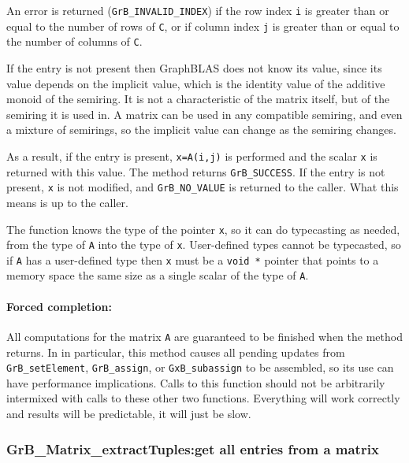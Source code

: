 \documentclass[12pt]{article}
\begin{document}
An error is returned (\verb'GrB_INVALID_INDEX') if the row index \verb'i' is
greater than or equal to the number of rows of \verb'C', or if column index
\verb'j' is greater than or equal to the number of columns of \verb'C'.

If the entry is not present then GraphBLAS does not know its value, since its
value depends on the implicit value, which is the identity value of the
additive monoid of the semiring.  It is not a characteristic of the matrix
itself, but of the semiring it is used in.  A matrix can be used in any
compatible semiring, and even a mixture of semirings, so the implicit value can
change as the semiring changes.

As a result, if the entry is present, \verb'x=A(i,j)' is performed and the
scalar \verb'x' is returned with this value.  The method returns
\verb'GrB_SUCCESS'.  If the entry is not present, \verb'x' is not modified, and
\verb'GrB_NO_VALUE' is returned to the caller.  What this means is up to the
caller.

The function knows the type of the pointer \verb'x', so it can do typecasting
as needed, from the type of \verb'A' into the type of \verb'x'.  User-defined
types cannot be typecasted, so if \verb'A' has a user-defined type then
\verb'x' must be a \verb'void *' pointer that points to a memory space the same
size as a single scalar of the type of \verb'A'.

\paragraph{Forced completion:}
All computations for the matrix \verb'A' are
guaranteed to be finished when the method returns.
%
In in particular, this method causes all pending updates from
\verb'GrB_setElement', \verb'GrB_assign', or \verb'GxB_subassign' to be
assembled, so its use can have performance implications.  Calls to this
function should not be arbitrarily intermixed with calls to these other two
functions.  Everything will work correctly and results will be predictable, it
will just be slow.

\subsubsection{{\sf GrB\_Matrix\_extractTuples:}get all entries from a matrix}
\label{matrix_extractTuples}
\end{document}
